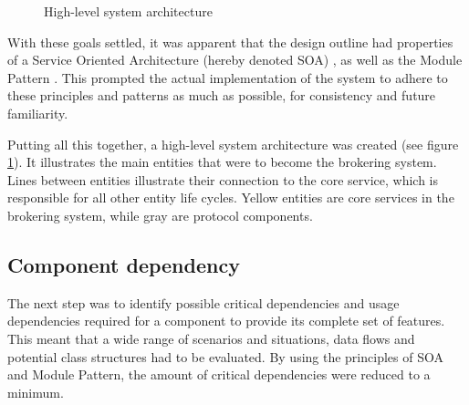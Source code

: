 \begin{center}
  \begin{figure}[ht!]
    \caption{High-level system architecture}
    \label{fig:abstract_architecture}
  \end{figure}
\end{center}

With these goals settled, it was apparent that the design outline had properties of a Service Oriented Architecture (hereby denoted SOA) \cite{soa}, as well as the Module Pattern \cite{module-pattern}. This prompted the actual implementation of the system to adhere to these principles and patterns as much as possible, for consistency and future familiarity.

Putting all this together, a high-level system architecture was created (see figure \ref{fig:abstract_architecture}). It illustrates the main entities that were to become the brokering system. Lines between entities illustrate their connection to the core service, which is responsible for all other entity life cycles. Yellow entities are core services in the brokering system, while gray are protocol components.

\subsection{Component dependency}
\label{subsec:architecture_and_implementation-broker_architecture-component_dependency}

The next step was to identify possible critical dependencies and usage dependencies required for a component to provide its complete set of features. This meant that a wide range of scenarios and situations, data flows and potential class structures had to be evaluated. By using the principles of SOA and Module Pattern, the amount of critical dependencies were reduced to a minimum.

